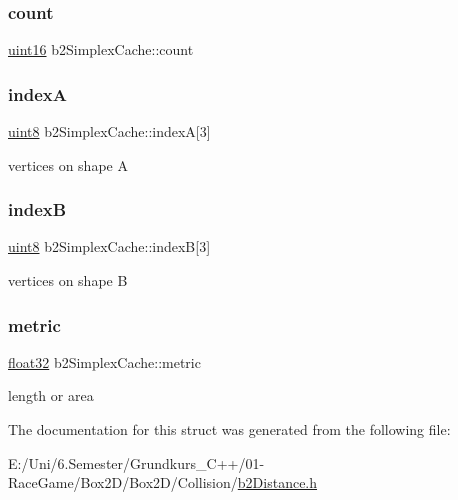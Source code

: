 \subsubsection{\texorpdfstring{count}{count}}
{\footnotesize\ttfamily \mbox{\hyperlink{b2_settings_8h_a05f6b0ae8f6a6e135b0e290c25fe0e4e}{uint16}} b2\+Simplex\+Cache\+::count}

\mbox{\label{structb2_simplex_cache_ab574159e69dda7e14ead8de848ca6b67}} 
\subsubsection{\texorpdfstring{indexA}{indexA}}
{\footnotesize\ttfamily \mbox{\hyperlink{b2_settings_8h_adde6aaee8457bee49c2a92621fe22b79}{uint8}} b2\+Simplex\+Cache\+::indexA\mbox{[}3\mbox{]}}



vertices on shape A 

\mbox{\label{structb2_simplex_cache_ab7586465ee2c5f7c3bdd8f80d5e256a7}} 
\subsubsection{\texorpdfstring{indexB}{indexB}}
{\footnotesize\ttfamily \mbox{\hyperlink{b2_settings_8h_adde6aaee8457bee49c2a92621fe22b79}{uint8}} b2\+Simplex\+Cache\+::indexB\mbox{[}3\mbox{]}}



vertices on shape B 

\mbox{\label{structb2_simplex_cache_a018e0a500b417d79bfed3f21310b15a2}} 
\subsubsection{\texorpdfstring{metric}{metric}}
{\footnotesize\ttfamily \mbox{\hyperlink{b2_settings_8h_aacdc525d6f7bddb3ae95d5c311bd06a1}{float32}} b2\+Simplex\+Cache\+::metric}



length or area 



The documentation for this struct was generated from the following file\+:\begin{DoxyCompactItemize}
\item 
E\+:/\+Uni/6.\+Semester/\+Grundkurs\+\_\+\+C++/01-\/\+Race\+Game/\+Box2\+D/\+Box2\+D/\+Collision/\mbox{\hyperlink{b2_distance_8h}{b2\+Distance.\+h}}\end{DoxyCompactItemize}
